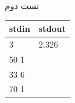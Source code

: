 تست دوم
\begin{latin}
	\begin{tabularx}{\textwidth}{|X | X|}
		\hline
		\textbf{stdin} &
		\textbf{stdout}\\
		\hline
		3 & 2.326\\
		50 1&\\
		33 6&\\
		70 1&\\
		\hline
		
	\end{tabularx}
\end{latin}











